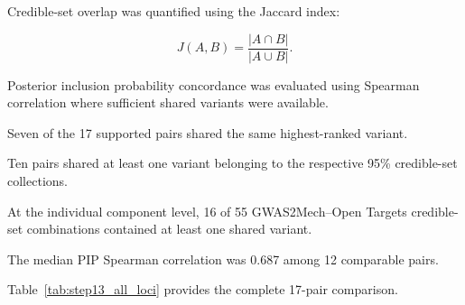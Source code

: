 \documentclass[11pt,a4paper]{article}
\begin{document}
Credible-set overlap was quantified using
the Jaccard index:

\begin{equation}
J(A,B)=\frac{|A\cap B|}{|A\cup B|}.
\end{equation}

Posterior inclusion probability concordance
was evaluated using Spearman correlation
where sufficient shared variants were
available.

Seven of the 17 supported pairs shared
the same highest-ranked variant.

Ten pairs shared at least one variant
belonging to the respective 95\%
credible-set collections.

At the individual component level,
16 of 55 GWAS2Mech--Open Targets
credible-set combinations contained
at least one shared variant.

The median PIP Spearman correlation
was 0.687 among 12 comparable pairs.

Table~\ref{tab:step13_all_loci} provides
the complete 17-pair comparison.
\end{document}
